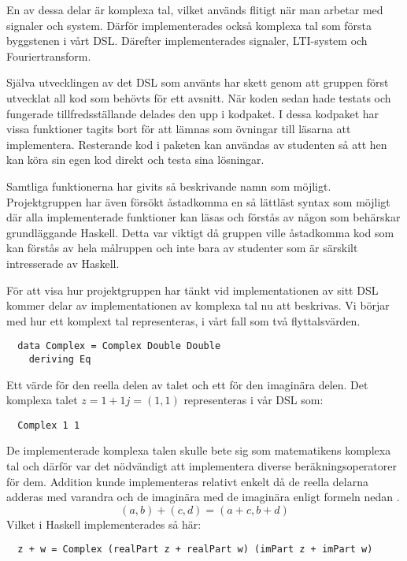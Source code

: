 \documentclass[12pt,a4paper,twoside,openright]{article}
\begin{document}
En av dessa delar är komplexa tal, vilket används flitigt när man
arbetar med signaler och system. Därför implementerades också komplexa
tal som första byggstenen i vårt DSL. Därefter implementerades
signaler, LTI-system och Fouriertransform.

Själva utvecklingen av det DSL som använts har skett genom att gruppen
först utvecklat all kod som behövts för ett avsnitt. När koden sedan
hade testats och fungerade tillfredsställande delades den upp i
kodpaket. I dessa kodpaket har vissa funktioner tagits bort för att
lämnas som övningar till läsarna att implementera. Resterande kod i
paketen kan användas av studenten så att hen kan köra sin egen kod
direkt och testa sina lösningar.

Samtliga funktionerna har givits så beskrivande namn som
möjligt. Projektgruppen har även försökt åstadkomma en så lättläst
syntax som möjligt där alla implementerade funktioner kan läsas och
förstås av någon som behärskar grundläggande Haskell. Detta var
viktigt då gruppen ville åstadkomma kod som kan förstås av hela
målruppen och inte bara av studenter som är särskilt intresserade av
Haskell.

För att visa hur projektgruppen har tänkt vid implementationen av sitt
DSL kommer delar av implementationen av komplexa tal nu att
beskrivas. Vi börjar med hur ett komplext tal representeras, i vårt
fall som två flyttalsvärden.
\begin{verbatim}
  data Complex = Complex Double Double
    deriving Eq
\end{verbatim}
Ett värde för den reella delen av talet och ett för den imaginära
delen. Det komplexa talet \(z = 1 + 1j = (1,1) \) representeras i vår
DSL som:

\begin{verbatim}
  Complex 1 1
\end{verbatim}

De implementerade komplexa talen skulle bete sig som matematikens
komplexa tal och därför var det nödvändigt att implementera diverse
beräkningsoperatorer för dem. Addition kunde implementeras relativt
enkelt då de reella delarna adderas med varandra och de imaginära med
de imaginära enligt formeln nedan \cite{conway1978functions}.
\[(a, b) + (c, d) = (a + c, b + d)\]
Vilket i Haskell implementerades så här:
\begin{verbatim}
  z + w = Complex (realPart z + realPart w) (imPart z + imPart w)
\end{verbatim}
\end{document}
